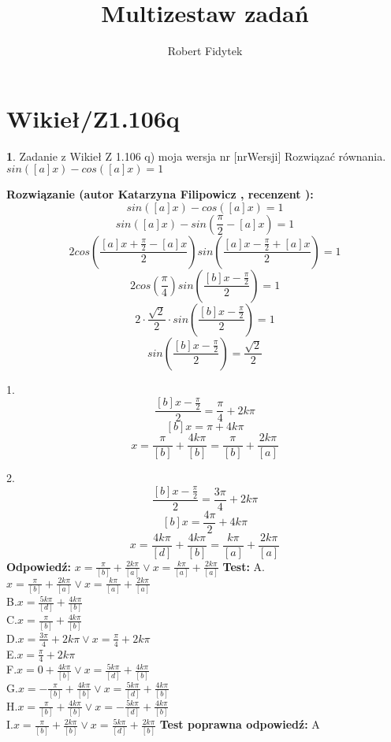 \documentclass[12pt, a4paper]{article}
\title{Multizestaw zadań}
\author{Robert Fidytek}
\date{}
\theoremstyle{definition} %
\newtheorem{zad}{}
\newcommand{\kategoria}[1]{\section{#1}} %
\newcommand{\zadStart}[1]{\begin{zad}#1\newline} %
\newcommand{\zadStop}{\end{zad}}   %
\newcommand{\rozwStart}[2]{\noindent \textbf{Rozwiązanie (autor #1 , recenzent #2): }\newline} %
\newcommand{\rozwStop}{\newline}                                            %
\newcommand{\odpStart}{\noindent \textbf{Odpowiedź:}\newline}    %
\newcommand{\odpStop}{\newline}                                             %
\newcommand{\testStart}{\noindent \textbf{Test:}\newline} %
\newcommand{\testStop}{\newline} %
\newcommand{\kluczStart}{\noindent \textbf{Test poprawna odpowiedź:}\newline} %
\newcommand{\kluczStop}{\newline} %
\begin{document}
\maketitle


\kategoria{Wikieł/Z1.106q}
\zadStart{Zadanie z Wikieł Z 1.106 q) moja wersja nr [nrWersji]}
Rozwiązać równania.\\
 $sin\left([a]x\right)-cos\left([a]x\right)=1$
\zadStop
\rozwStart{Katarzyna Filipowicz}{}
$$
sin\left([a]x\right)-cos\left([a]x\right)=1
$$ $$
sin\left([a]x\right)-sin\left(\frac{\pi}{2}-[a]x\right)=1
$$  $$
2cos\left(\frac{[a]x+\frac{\pi}{2}-[a]x}{2}\right)sin\left(\frac{[a]x-\frac{\pi}{2}+[a]x}{2}\right)=1
$$ $$
2cos\left(\frac{\pi}{4}\right)      sin\left(\frac{[b]x-\frac{\pi}{2}}{2}\right)=1
$$ $$
2\cdot \frac{\sqrt{2}}{2}\cdot     sin\left(\frac{[b]x-\frac{\pi}{2}}{2}\right)=1
$$  $$
sin\left(\frac{[b]x-\frac{\pi}{2}}{2}\right)=\frac{\sqrt{2}}{2}
$$ 

1. 
$$
\frac{[b]x-\frac{\pi}{2}}{2}=\frac{\pi}{4}+2k\pi
$$ $$
 [b]x=\pi+4k\pi
$$ $$
x=\frac{\pi}{[b]}+\frac{4k\pi}{[b]}=\frac{\pi}{[b]}+\frac{2k\pi}{[a]}
$$

2. 
$$
\frac{[b]x-\frac{\pi}{2}}{2}=\frac{3\pi}{4}+2k\pi
$$ $$
 [b]x=\frac{4\pi}{2}+4k\pi
$$ $$
x=\frac{4k\pi}{[d]}+\frac{4k\pi}{[b]}=\frac{k\pi}{[a]}+\frac{2k\pi}{[a]}
$$
\rozwStop
\odpStart
$x=\frac{\pi}{[b]}+\frac{2k\pi}{[a]} \vee x=\frac{k\pi}{[a]}+\frac{2k\pi}{[a]}$
\odpStop
\testStart
A.$x=\frac{\pi}{[b]}+\frac{2k\pi}{[a]} \vee x=\frac{k\pi}{[a]}+\frac{2k\pi}{[a]}$\\
B.$x=\frac{5k\pi}{[d]}+\frac{4k\pi}{[b]}$\\
C.$x=\frac{\pi}{[b]}+\frac{4k\pi}{[b]}$\\
D.$x=\frac{3\pi}{4}+2k\pi \vee x=\frac{\pi}{4}+2k\pi$\\
E.$x=\frac{\pi}{4}+2k\pi$\\
F.$x=0+\frac{4k\pi}{[b]} \vee x=\frac{5k\pi}{[d]}+\frac{4k\pi}{[b]}$\\
G.$x=-\frac{\pi}{[b]}+\frac{4k\pi}{[b]} \vee x=\frac{5k\pi}{[d]}+\frac{4k\pi}{[b]}$\\
H.$x=\frac{\pi}{[b]}+\frac{4k\pi}{[b]} \vee x=-\frac{5k\pi}{[d]}+\frac{4k\pi}{[b]}$\\
I.$x=\frac{\pi}{[b]}+\frac{2k\pi}{[b]} \vee x=\frac{5k\pi}{[d]}+\frac{2k\pi}{[b]}$
\testStop
\kluczStart
A
\kluczStop
\end{document}
